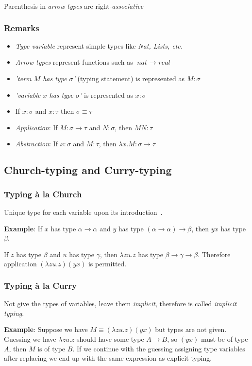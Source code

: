 \documentclass[12pt, a4paper]{article}
\newcommand{\ra}{\rightarrow}
\begin{document}
Parenthesis in \textit{arrow types} are right-\textit{associative}

\subsubsection{Remarks}
\begin{itemize}
    \item \textit{Type variable} represent simple types like \textit{Nat, Lists, etc.}
    \item \textit{Arrow types} represent functions such as $\textit{nat } \ra \textit{ real}$
    \item \textit{'term $M$ has type $\sigma$'} (typing statement) is represented as $M : \sigma$
    \item \textit{'variable $x$ has type $\sigma$'} is represented as $x : \sigma$
    \item If $x : \sigma$ and $x : \tau$ then $\sigma \equiv \tau$
    \item \textit{Application}: If $M : \sigma \ra \tau$ and $N : \sigma$, then $MN : \tau$ 
    \item \textit{Abstraction}: If $x : \sigma$ and $M : \tau$, then $\lambda x. M : \sigma \ra \tau$ 
\end{itemize}

\subsection{Church-typing and Curry-typing}
\subsubsection{Typing à la Church}
Unique type for each variable upon its introduction~\cite{church}.

\textbf{Example}: If $x$ has type $\alpha \ra \alpha$ and $y$ has type $(\alpha \ra \alpha) \ra \beta$, then $yx$ has type $\beta$.

If $z$ has type $\beta$ and $u$ has type $\gamma$, then $\lambda zu.z$ has type $\beta \ra \gamma \ra \beta$.
Therefore application $(\lambda zu.z)(yx)$ is permitted.

\subsubsection{Typing à la Curry}
Not give the types of variables, leave them \textit{implicit}, therefore is called \textit{implicit typing}.

\textbf{Example}: Suppose we have $M \equiv (\lambda zu.z)(yx)$ but types are not given. 
Guessing we have $\lambda zu.z$ should have some type $A \ra B$, so $(yx)$ must be of type $A$, then $M$ is of type $B$.
If we continue with the guessing assigning type variables after replacing we end up with the same expression as explicit typing.
\end{document}
